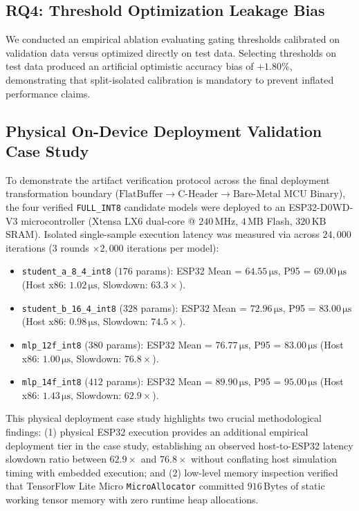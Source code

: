\documentclass[journal]{IEEEtran}
\begin{document}
\subsection{RQ4: Threshold Optimization Leakage Bias}
We conducted an empirical ablation evaluating gating thresholds calibrated on validation data versus optimized directly on test data. Selecting thresholds on test data produced an artificial optimistic accuracy bias of \textbf{$+1.80\%$}, demonstrating that split-isolated calibration is mandatory to prevent inflated performance claims.

\subsection{Physical On-Device Deployment Validation Case Study}
To demonstrate the artifact verification protocol across the final deployment transformation boundary ($\text{FlatBuffer} \rightarrow \text{C-Header} \rightarrow \text{Bare-Metal MCU Binary}$), the four verified \texttt{FULL\_INT8} candidate models were deployed to an ESP32-D0WD-V3 microcontroller (Xtensa LX6 dual-core @ $240\,\text{MHz}$, $4\,\text{MB}$ Flash, $320\,\text{KB}$ SRAM). Isolated single-sample execution latency was measured via  across $24,000$ iterations ($3$ rounds $\times 2,000$ iterations per model):
\begin{itemize}
    \item \texttt{student\_a\_8\_4\_int8} ($176$ params): ESP32 Mean = $64.55\,\si{\micro\second}$, P95 = $69.00\,\si{\micro\second}$ (Host x86: $1.02\,\si{\micro\second}$, Slowdown: $63.3\times$).
    \item \texttt{student\_b\_16\_4\_int8} ($328$ params): ESP32 Mean = $72.96\,\si{\micro\second}$, P95 = $83.00\,\si{\micro\second}$ (Host x86: $0.98\,\si{\micro\second}$, Slowdown: $74.5\times$).
    \item \texttt{mlp\_12f\_int8} ($380$ params): ESP32 Mean = $76.77\,\si{\micro\second}$, P95 = $83.00\,\si{\micro\second}$ (Host x86: $1.00\,\si{\micro\second}$, Slowdown: $76.8\times$).
    \item \texttt{mlp\_14f\_int8} ($412$ params): ESP32 Mean = $89.90\,\si{\micro\second}$, P95 = $95.00\,\si{\micro\second}$ (Host x86: $1.43\,\si{\micro\second}$, Slowdown: $62.9\times$).
\end{itemize}
This physical deployment case study highlights two crucial methodological findings: (1) physical ESP32 execution provides an additional empirical deployment tier in the case study, establishing an observed host-to-ESP32 latency slowdown ratio between $62.9\times$ and $76.8\times$ without conflating host simulation timing with embedded execution; and (2) low-level memory inspection verified that TensorFlow Lite Micro \texttt{MicroAllocator} committed $916\,\text{Bytes}$ of static working tensor memory with zero runtime heap allocations.
\end{document}
